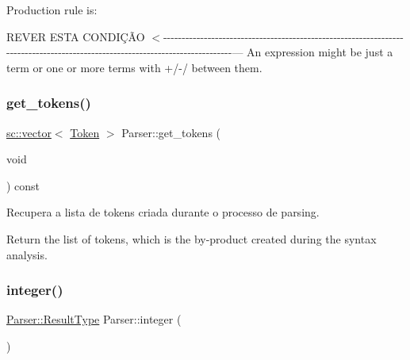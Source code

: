 Production rule is\+: 
 R\+E\+V\+ER E\+S\+TA C\+O\+N\+D\+IÇÃO $<$-\/-\/-\/-\/-\/-\/-\/-\/-\/-\/-\/-\/-\/-\/-\/-\/-\/-\/-\/-\/-\/-\/-\/-\/-\/-\/-\/-\/-\/-\/-\/-\/-\/-\/-\/-\/-\/-\/-\/-\/-\/-\/-\/-\/-\/-\/-\/-\/-\/-\/-\/-\/-\/-\/-\/-\/-\/-\/-\/-\/-\/-\/-\/-\/-\/-\/-\/-\/-\/-\/-\/-\/-\/-\/-\/-\/-\/-\/-\/-\/-\/-\/-\/-\/-\/-\/-\/-\/-\/-\/-\/-\/-\/-\/-\/-\/-\/-\/-\/-\/-\/-\/-\/-\/-\/-\/-\/-\/-\/-\/-\/-\/-\/-\/-\/-\/-\/-\/-\/-\/-\/-\/-\/-\/-\/-\/--- An expression might be just a term or one or more terms with \textquotesingle{}+\textquotesingle{}/\textquotesingle{}-\/\textquotesingle{}/\textquotesingle{}\textquotesingle{} between them. \mbox{\label{classParser_a4cd9c7937197721f850eabb3a2178ced}} 
\subsubsection{\texorpdfstring{get\+\_\+tokens()}{get\_tokens()}}
{\footnotesize\ttfamily \hyperlink{classsc_1_1vector}{sc\+::vector}$<$ \hyperlink{structToken}{Token} $>$ Parser\+::get\+\_\+tokens (\begin{DoxyParamCaption}\item[{void}]{ }\end{DoxyParamCaption}) const}



Recupera a lista de tokens criada durante o processo de parsing. 

Return the list of tokens, which is the by-\/product created during the syntax analysis. \mbox{\label{classParser_ab6b91c4e4b8bacb7d0eefca5ae9ffce6}} 
\subsubsection{\texorpdfstring{integer()}{integer()}}
{\footnotesize\ttfamily \hyperlink{structParser_1_1ResultType}{Parser\+::\+Result\+Type} Parser\+::integer (\begin{DoxyParamCaption}{ }\end{DoxyParamCaption})\hspace{0.3cm}{\ttfamily [private]}}



